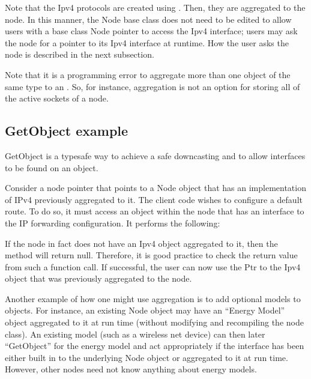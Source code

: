 \documentclass[letterpaper,10pt,english]{sphinxmanual}
\renewcommand{\sphinxcode}[1]{\texttt{\small{#1}}}
\begin{document}
Note that the Ipv4 protocols are created using \sphinxcode{}.
Then, they are aggregated to the node. In this manner, the Node base class does
not need to be edited to allow users with a base class Node pointer to access
the Ipv4 interface; users may ask the node for a pointer to its Ipv4 interface
at runtime. How the user asks the node is described in the next subsection.

Note that it is a programming error to aggregate more than one object of the
same type to an \sphinxcode{}. So, for instance, aggregation is not
an option for storing all of the active sockets of a node.


\subsection{GetObject example}
\label{\detokenize{object-model:getobject-example}}
GetObject is a type\sphinxhyphen{}safe way to achieve a safe downcasting and to allow
interfaces to be found on an object.

Consider a node pointer \sphinxcode{} that points to a Node object that has an
implementation of IPv4 previously aggregated to it. The client code wishes to
configure a default route. To do so, it must access an object within the node
that has an interface to the IP forwarding configuration. It performs the
following:

\begin{sphinxVerbatim}[commandchars=\\\{\}]
    
\end{sphinxVerbatim}

If the node in fact does not have an Ipv4 object aggregated to it, then the
method will return null. Therefore, it is good practice to check the return
value from such a function call. If successful, the user can now use the Ptr to
the Ipv4 object that was previously aggregated to the node.

Another example of how one might use aggregation is to add optional models to
objects. For instance, an existing Node object may have an “Energy Model” object
aggregated to it at run time (without modifying and recompiling the node class).
An existing model (such as a wireless net device) can then later “GetObject” for
the energy model and act appropriately if the interface has been either built in
to the underlying Node object or aggregated to it at run time.  However, other
nodes need not know anything about energy models.
\end{document}
